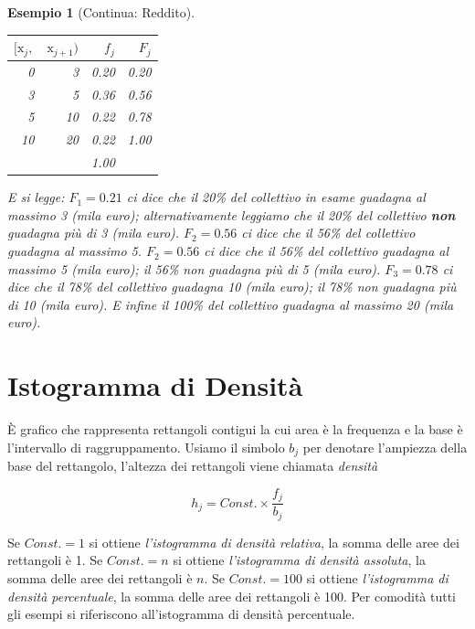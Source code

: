 \documentclass[
  11pt,
]{book}
\theoremstyle{mytheoremstyle}
\theoremstyle{mydefstyle}
\newtheorem{example}{{Esempio}}[section]
\begin{document}
\begin{example}[Continua: Reddito]
\(\phantom{.}\)

\begin{center}

\begin{table}[H]
\centering
\begin{tabular}[t]{rrrr}
\toprule
$[\text{x}_j,$ & $\text{x}_{j+1})$ & $f_j$ & $F_j$\\
\midrule
0 & 3 & 0.20 & 0.20\\
3 & 5 & 0.36 & 0.56\\
5 & 10 & 0.22 & 0.78\\
10 & 20 & 0.22 & 1.00\\
 &  & 1.00 & \\
\bottomrule
\end{tabular}
\end{table}

\end{center}

E si legge: \(F_1=0.21\) ci dice che il 20\% del collettivo in esame guadagna al massimo 3 (mila euro); alternativamente leggiamo che il 20\% del collettivo \textbf{non} guadagna più di 3 (mila euro). \(F_2=0.56\) ci dice che il 56\% del collettivo guadagna al massimo 5. \(F_2=0.56\) ci dice che il 56\% del collettivo guadagna al massimo 5 (mila euro); il 56\% non guadagna più di 5 (mila euro). \(F_3=0.78\) ci dice che il 78\% del collettivo guadagna 10 (mila euro); il 78\% non guadagna più di 10 (mila euro). E infine il 100\% del collettivo guadagna al massimo 20 (mila euro).
\end{example}

\section{Istogramma di Densità}\label{istogramma-di-densituxe0}

È grafico che rappresenta rettangoli contigui la cui area è la frequenza e la base è l'intervallo di raggruppamento. Usiamo il simbolo \(b_j\) per denotare l'ampiezza della base del rettangolo, l'altezza dei rettangoli viene chiamata \emph{densità}

\begin{info}
\[h_j = Const.\times \frac {f_j} {b_j}\]

\end{info}

Se \(Const.=1\) si ottiene \emph{l'istogramma di densità relativa}, la somma delle aree dei rettangoli è 1. Se \(Const.=n\) si ottiene \emph{l'istogramma di densità assoluta}, la somma delle aree dei rettangoli è \(n\). Se \(Const.=100\) si ottiene \emph{l'istogramma di densità percentuale}, la somma delle aree dei rettangoli è 100. Per comodità tutti gli esempi si riferiscono all'istogramma di densità percentuale.
\end{document}

